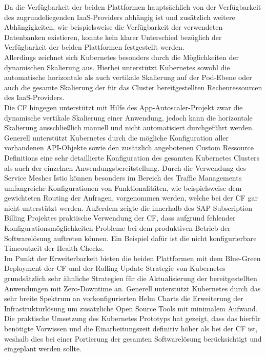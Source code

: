 Da die Verfügbarkeit der beiden Plattformen hauptsächlich von der Verfügbarkeit des zugrundeliegenden \ac{IaaS}-Providers abhängig ist und zusätzlich weitere Abhängigkeiten, wie beispielsweise die Verfügbarkeit der verwendeten Datenbanken existieren, konnte kein klarer Unterschied bezüglich der Verfügbarkeit der beiden Plattformen festgestellt werden.\\
Allerdings zeichnet sich Kubernetes besonders durch die Möglichkeiten der dynamischen Skalierung aus. Hierbei unterstützt Kubernetes sowohl die automatische horizontale als auch vertikale Skalierung auf der Pod-Ebene oder auch die gesamte Skalierung der für das Cluster bereitgestellten Rechenressourcen des \ac{IaaS}-Providers.\\
Die \ac{CF} hingegen unterstützt mit Hilfe des App-Autoscaler-Projekt zwar die dynamische vertikale Skalierung einer Anwendung, jedoch kann die horizontale Skalierung ausschließlich manuell und nicht automatisiert durchgeführt werden.\\
Generell unterstützt Kubernetes durch die mögliche Konfiguration aller vorhandenen \ac{API}-Objekte sowie den zusätzlich angebotenen Custom Ressource Definitions eine sehr detaillierte Konfiguration des gesamten Kubernetes Clusters als auch der einzelnen Anwendungsbereitstellung. Durch die Verwendung des Service Meshes Istio können besonders im Bereich des Traffic Managements umfangreiche Konfigurationen von Funktionalitäten, wie beispielsweise dem gewichteten Routing der Anfragen, vorgenommen werden, welche bei der \ac{CF} gar nicht unterstützt werden. Außerdem zeigte die innerhalb des SAP Subscription Billing Projektes praktische Verwendung der \ac{CF}, dass aufgrund fehlender Konfigurationsmöglichkeiten Probleme bei dem produktiven Betrieb der Softwarelösung auftreten können. Ein Beispiel dafür ist die nicht konfigurierbare Timeoutzeit der Health Checks.\\
Im Punkt der Erweiterbarkeit bieten die beiden Plattformen mit dem Blue-Green Deployment der \ac{CF} und der Rolling Update Strategie von Kubernetes grundsätzlich sehr ähnliche Strategien für die Aktualisierung der bereitgestellten Anwendungen mit Zero-Downtime an. Generell unterstützt Kubernetes durch das sehr breite Spektrum an vorkonfigurierten Helm Charts die Erweiterung der Infrastrukturlösung um zusätzliche Open Source Tools mit minimalem Aufwand.\\
Die praktische Umsetzung des Kubernetes Prototyps hat gezeigt, dass das hierfür benötigte Vorwissen und die Einarbeitungszeit definitiv höher als bei der \ac{CF} ist, weshalb dies bei einer Portierung der gesamten Softwarelösung berücksichtigt und eingeplant werden sollte.\\
